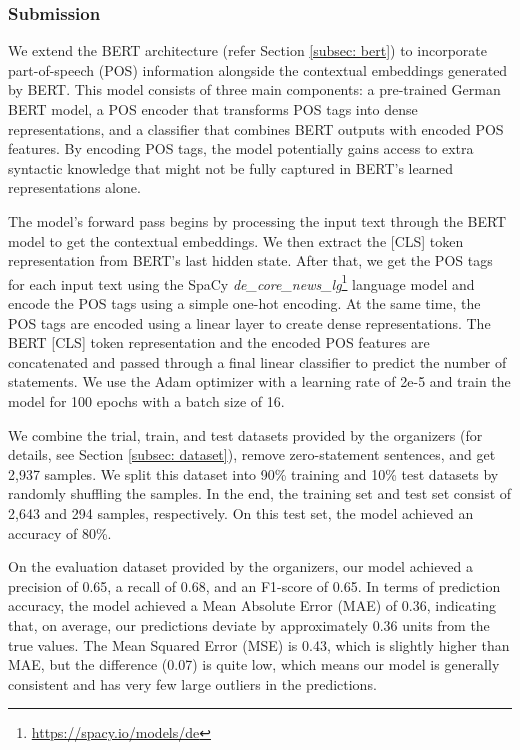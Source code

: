 \documentclass[11pt]{article}
\begin{document}
\subsubsection{Submission}\label{subsubsec: subtask1-submission}

We extend the BERT architecture (refer Section \ref{subsec: bert}) to incorporate part-of-speech (POS) information alongside the contextual embeddings generated by BERT. This model consists of three main components: a pre-trained German BERT model, a POS encoder that transforms POS tags into dense representations, and a classifier that combines BERT outputs with encoded POS features. By encoding POS tags, the model potentially gains access to extra syntactic knowledge that might not be fully captured in BERT's learned representations alone.

The model's forward pass begins by processing the input text through the BERT model to get the contextual embeddings. We then extract the [CLS] token representation from BERT's last hidden state. After that, we get the POS tags for each input text using the SpaCy \textit{de\_core\_news\_lg}\footnote{\url{https://spacy.io/models/de}} language model and encode the POS tags using a simple one-hot encoding. At the same time, the POS tags are encoded using a linear layer to create dense representations. The BERT [CLS] token representation and the encoded POS features are concatenated and passed through a final linear classifier to predict the number of statements. We use the Adam optimizer \citep{kingma2014adam} with a learning rate of 2e-5 and train the model for 100 epochs with a batch size of 16.

We combine the trial, train, and test datasets provided by the organizers (for details, see Section \ref{subsec: dataset}), remove zero-statement sentences, and get 2,937 samples. We split this dataset into 90\% training and 10\% test datasets by randomly shuffling the samples. In the end, the training set and test set consist of 2,643 and 294 samples, respectively. On this test set, the model achieved an accuracy of 80\%.

On the evaluation dataset provided by the organizers, our model achieved a precision of 0.65, a recall of 0.68, and an F1-score of 0.65. In terms of prediction accuracy, the model achieved a  Mean Absolute Error (MAE) of 0.36, indicating that, on average, our predictions deviate by approximately 0.36 units from the true values. The Mean Squared Error (MSE) is 0.43, which is slightly higher than MAE, but the difference (0.07) is quite low, which means our model is generally consistent and has very few large outliers in the predictions.
\end{document}
